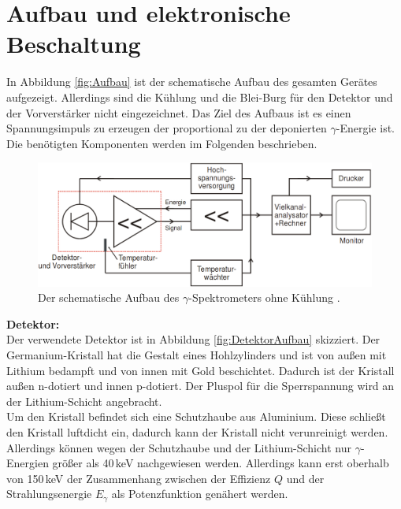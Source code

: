 \section{Aufbau und elektronische Beschaltung}
In Abbildung \eqref{fig:Aufbau} ist der schematische Aufbau des gesamten Gerätes aufgezeigt. Allerdings sind die Kühlung und die Blei-Burg für den Detektor und der Vorverstärker nicht eingezeichnet. Das Ziel des Aufbaus ist es einen Spannungsimpuls zu erzeugen der proportional zu der deponierten $\gamma$-Energie ist. Die benötigten Komponenten werden im Folgenden beschrieben.

\begin{figure}[H]
  \centering
  \includegraphics[width=\linewidth]{Bilder/Aufbau.png}
  \caption{Der schematische Aufbau des $\gamma$-Spektrometers ohne Kühlung \cite{V18}.}
  \label{fig:Aufbau}
\end{figure}

\textbf{Detektor:} \\
Der verwendete Detektor ist in Abbildung \eqref{fig:DetektorAufbau} skizziert. Der Germanium-Kristall hat die Gestalt eines Hohlzylinders und ist von außen mit Lithium bedampft und von innen mit Gold beschichtet. Dadurch ist der Kristall außen n-dotiert und innen p-dotiert. Der Pluspol für die Sperrspannung wird an der Lithium-Schicht angebracht. \\
Um den Kristall befindet sich eine Schutzhaube aus Aluminium. Diese schließt den Kristall luftdicht ein, dadurch kann der Kristall nicht verunreinigt werden. Allerdings können wegen der Schutzhaube und der Lithium-Schicht nur $\gamma$-Energien größer als 40\,keV nachgewiesen werden. Allerdings kann erst oberhalb von 150\,keV der Zusammenhang zwischen der Effizienz $Q$ und der Strahlungsenergie $E_\gamma$ als Potenzfunktion genähert werden.

